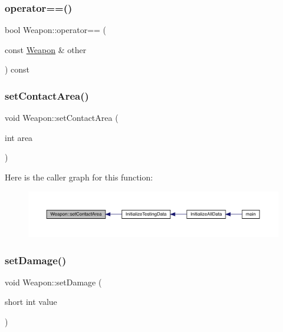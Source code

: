 \mbox{\label{class_weapon_a775cb30927bd7d89b9666a1fd9f8ed5f}} 
\subsubsection{\texorpdfstring{operator==()}{operator==()}}
{\footnotesize\ttfamily bool Weapon\+::operator== (\begin{DoxyParamCaption}\item[{const \mbox{\hyperlink{class_weapon}{Weapon}} \&}]{other }\end{DoxyParamCaption}) const}

\mbox{\label{class_weapon_ab5365be296cfc81438b458814ca2b9a2}} 
\subsubsection{\texorpdfstring{set\+Contact\+Area()}{setContactArea()}}
{\footnotesize\ttfamily void Weapon\+::set\+Contact\+Area (\begin{DoxyParamCaption}\item[{int}]{area }\end{DoxyParamCaption})}

Here is the caller graph for this function\+:
\nopagebreak
\begin{figure}[H]
\begin{center}
\leavevmode
\includegraphics[width=350pt]{db/de5/class_weapon_ab5365be296cfc81438b458814ca2b9a2_icgraph}
\end{center}
\end{figure}
\mbox{\label{class_weapon_a0c582ba1c1413a4ecda931bb8acff458}} 
\subsubsection{\texorpdfstring{set\+Damage()}{setDamage()}}
{\footnotesize\ttfamily void Weapon\+::set\+Damage (\begin{DoxyParamCaption}\item[{short int}]{value }\end{DoxyParamCaption})}

